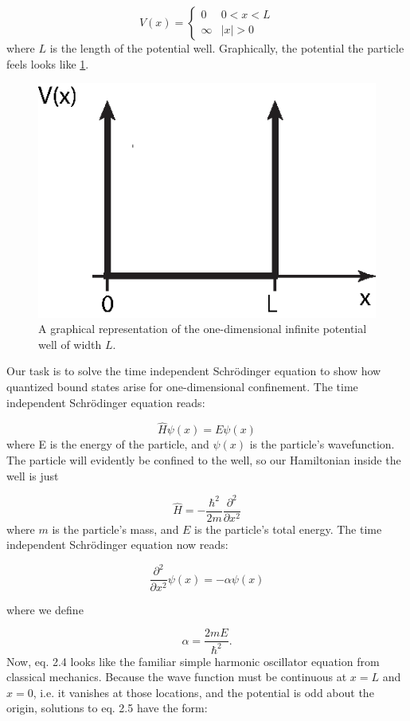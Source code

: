 \[ V(x) = \begin{cases} 
      0 & 0 < x < L \\
      \infty & |x| > 0 
   \end{cases}
\]
where $L$ is the length of the potential well. Graphically, the potential the particle feels looks like \ref{infp}.

\begin{figure}[h!]
\label{infp}
\centering
\includegraphics[width = .6\textwidth]{infpotential.eps}
\caption{\doublespacing A graphical representation of the one-dimensional infinite potential well of width $L$.}
\end{figure}

Our task is to solve the time independent Schr\"{o}dinger equation to show how quantized bound states arise for one-dimensional confinement. The time independent Schr\"{o}dinger equation reads:

\begin{equation}
\hat{H} \psi(x) = E\psi(x)
\end{equation}
where E is the energy of the particle, and $\psi(x)$ is the particle's wavefunction. The particle will evidently be confined to the well, so our Hamiltonian inside the well is just

\begin{equation}
\hat{H} = - \frac{\hbar^2}{2m} \frac{\partial^2}{\partial x^2}
\label{hamil}
\end{equation}
where $m$ is the particle's mass, and $E$ is the particle's  total energy. The time independent Schr\"{o}dinger equation now reads:

\begin{equation} \label{tise}
\frac{\partial^2}{\partial x^2} \psi(x) = - \alpha \psi(x)
\end{equation}

where we define 

\begin{equation}
\alpha = \frac{2mE}{\hbar^2}.
\end{equation}
Now, eq. 2.4 looks like the familiar simple harmonic oscillator equation from classical mechanics. Because the wave function must be continuous at $x = L$ and $ x = 0$, i.e. it vanishes at those locations, and the potential is odd about the origin,  solutions to eq. 2.5 have the form:

